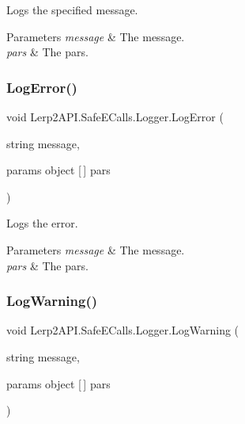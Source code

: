 Logs the specified message. 


\begin{DoxyParams}{Parameters}
{\em message} & The message.\\
\hline
{\em pars} & The pars.\\
\hline
\end{DoxyParams}
\mbox{\label{class_lerp2_a_p_i_1_1_safe_e_calls_1_1_logger_a58926654a815d526808a9c204de3c1b0}} 
\subsubsection{\texorpdfstring{Log\+Error()}{LogError()}}
{\footnotesize\ttfamily void Lerp2\+A\+P\+I.\+Safe\+E\+Calls.\+Logger.\+Log\+Error (\begin{DoxyParamCaption}\item[{string}]{message,  }\item[{params object \mbox{[}$\,$\mbox{]}}]{pars }\end{DoxyParamCaption})\hspace{0.3cm}{\ttfamily [inline]}}



Logs the error. 


\begin{DoxyParams}{Parameters}
{\em message} & The message.\\
\hline
{\em pars} & The pars.\\
\hline
\end{DoxyParams}
\mbox{\label{class_lerp2_a_p_i_1_1_safe_e_calls_1_1_logger_a2890fe877c2b2d9225d6f3dee0998ce6}} 
\subsubsection{\texorpdfstring{Log\+Warning()}{LogWarning()}}
{\footnotesize\ttfamily void Lerp2\+A\+P\+I.\+Safe\+E\+Calls.\+Logger.\+Log\+Warning (\begin{DoxyParamCaption}\item[{string}]{message,  }\item[{params object \mbox{[}$\,$\mbox{]}}]{pars }\end{DoxyParamCaption})\hspace{0.3cm}{\ttfamily [inline]}}




